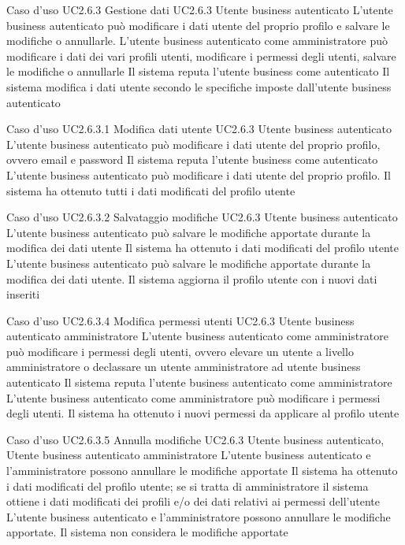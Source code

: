 \UCtitle
{Caso d'uso UC2.6.3}
{Gestione dati}
\UC
{UC2.6.3}
{Utente business autenticato}
{L'utente business autenticato può modificare i dati utente del proprio profilo e salvare le modifiche o annullarle. L'utente business autenticato come amministratore può modificare i dati dei vari profili utenti, modificare i permessi degli utenti, salvare le modifiche o annullarle}
{Il sistema reputa l'utente business come autenticato}
\post
{Il sistema modifica i dati utente secondo le specifiche imposte dall'utente business autenticato}

\UCtitle
{Caso d'uso UC2.6.3.1}
{Modifica dati utente}
\UC
{UC2.6.3}
{Utente business autenticato}
{L'utente business autenticato può modificare i dati utente del proprio profilo, ovvero email e password}
{Il sistema reputa l'utente business come autenticato}
\scenario
{L'utente business autenticato può modificare i dati utente del proprio profilo.}
\post
{Il sistema ha ottenuto tutti i dati modificati del profilo utente}

\UCtitle
{Caso d'uso UC2.6.3.2}
{Salvataggio modifiche}
\UC
{UC2.6.3}
{Utente business autenticato}
{L'utente business autenticato può salvare le modifiche apportate durante la modifica dei dati utente}
{Il sistema ha ottenuto i dati modificati del profilo utente}
\scenario
{L'utente business autenticato può salvare le modifiche apportate durante la modifica dei dati utente.}
\post
{Il sistema aggiorna il profilo utente con i nuovi dati inseriti}

\UCtitle
{Caso d'uso UC2.6.3.4}
{Modifica permessi utenti}
\UC
{UC2.6.3}
{Utente business autenticato amministratore}
{L'utente business autenticato come amministratore può modificare i permessi degli utenti, ovvero elevare un utente a livello amministratore o declassare un utente amministratore ad utente business autenticato}
{Il sistema reputa l'utente business autenticato come amministratore}
\scenario
{L'utente business autenticato come amministratore può modificare i permessi degli utenti.}
\post
{Il sistema ha ottenuto i nuovi permessi da applicare al profilo utente}

\UCtitle
{Caso d'uso UC2.6.3.5}
{Annulla modifiche}
\UC
{UC2.6.3}
{Utente business autenticato, Utente business autenticato amministratore}
{L'utente business autenticato e l'amministratore possono annullare le modifiche apportate}
{Il sistema ha ottenuto i dati modificati del profilo utente; se si tratta di amministratore il sistema ottiene i dati modificati dei profili e/o dei dati relativi ai permessi dell'utente}
\scenario
{L'utente business autenticato e l'amministratore possono annullare le modifiche apportate.}
\post
{Il sistema non considera le modifiche apportate}
